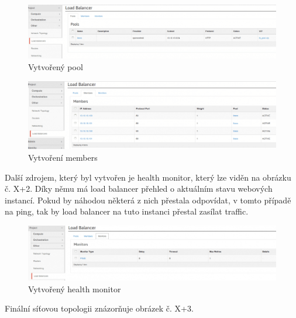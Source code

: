 \begin{figure}[h]
\begin{centering}
\includegraphics[scale=0.45]{images/lbaas1}
\par\end{centering}
\caption{Vytvořený pool\label{fig:lbaas1}}
\end{figure}

\begin{figure}[h]
\begin{centering}
\includegraphics[scale=0.45]{images/lbaas2}
\par\end{centering}
\caption{Vytvoření members\label{fig:lbaas2}}
\end{figure}

Další zdrojem, který byl vytvořen je health monitor, který lze viděn na obrázku č. X+2. Díky němu má load balancer přehled o aktuálním stavu webových instancí. Pokud by náhodou některá z nich přestala odpovídat, v tomto případě na ping, tak by load balancer na tuto instanci přestal zasílat traffic.

\begin{figure}[h]
\begin{centering}
\includegraphics[scale=0.45]{images/lbaas3}
\par\end{centering}
\caption{Vytvořený health monitor\label{fig:lbaas3}}
\end{figure}

Finální síťovou topologii znázorňuje obrázek č. X+3. 


